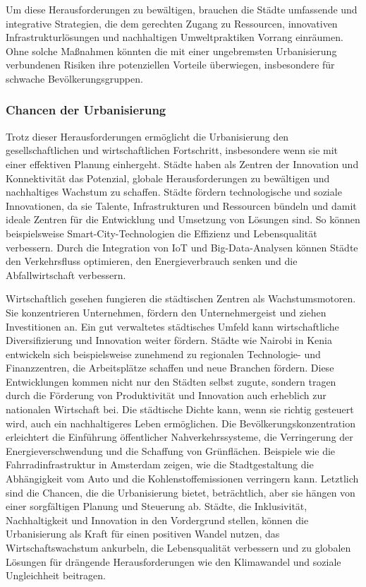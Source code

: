 \documentclass[conference,compsoc,final,a4paper, onecolumn, 11pt]{IEEEtran}
\begin{document}
Um diese Herausforderungen zu bewältigen, brauchen die Städte umfassende und integrative Strategien, die dem gerechten Zugang zu Ressourcen, innovativen Infrastrukturlösungen und nachhaltigen Umweltpraktiken Vorrang einräumen. 
Ohne solche Maßnahmen könnten die mit einer ungebremsten Urbanisierung verbundenen Risiken ihre potenziellen Vorteile überwiegen, insbesondere für schwache Bevölkerungsgruppen.


\subsubsection{Chancen der Urbanisierung}
Trotz dieser Herausforderungen ermöglicht die Urbanisierung den gesellschaftlichen und wirtschaftlichen Fortschritt, insbesondere wenn sie mit einer effektiven Planung einhergeht. 
Städte haben als Zentren der Innovation und Konnektivität das Potenzial, globale Herausforderungen zu bewältigen und nachhaltiges Wachstum zu schaffen. \autocite[S. 5ff]{Zhang2015-vv}
Städte fördern technologische und soziale Innovationen, da sie Talente, Infrastrukturen und Ressourcen bündeln und damit ideale Zentren für die Entwicklung und Umsetzung von Lösungen sind. \autocite[S. 5ff]{Zhang2015-vv}
So können beispielsweise Smart-City-Technologien die Effizienz und Lebensqualität verbessern. 
Durch die Integration von \ac{IoT} und Big-Data-Analysen können Städte den Verkehrsfluss optimieren, den Energieverbrauch senken und die Abfallwirtschaft verbessern. 

Wirtschaftlich gesehen fungieren die städtischen Zentren als Wachstumsmotoren. 
Sie konzentrieren Unternehmen, fördern den Unternehmergeist und ziehen Investitionen an. 
Ein gut verwaltetes städtisches Umfeld kann wirtschaftliche Diversifizierung und Innovation weiter fördern. \autocite[S. 5ff]{Zhang2015-vv}
Städte wie Nairobi in Kenia entwickeln sich beispielsweise zunehmend zu regionalen Technologie- und Finanzzentren, die Arbeitsplätze schaffen und neue Branchen fördern. 
Diese Entwicklungen kommen nicht nur den Städten selbst zugute, sondern tragen durch die Förderung von Produktivität und Innovation auch erheblich zur nationalen Wirtschaft bei. \autocite{gill_nairobis_2019}
Die städtische Dichte kann, wenn sie richtig gesteuert wird, auch ein nachhaltigeres Leben ermöglichen. 
Die Bevölkerungskonzentration erleichtert die Einführung öffentlicher Nahverkehrssysteme, die Verringerung der Energieverschwendung und die Schaffung von Grünflächen. 
Beispiele wie die Fahrradinfrastruktur in Amsterdam zeigen, wie die Stadtgestaltung die Abhängigkeit vom Auto und die Kohlenstoffemissionen verringern kann. \autocite{Buehler2010-pf}
Letztlich sind die Chancen, die die Urbanisierung bietet, beträchtlich, aber sie hängen von einer sorgfältigen Planung und Steuerung ab. 
Städte, die Inklusivität, Nachhaltigkeit und Innovation in den Vordergrund stellen, können die Urbanisierung als Kraft für einen positiven Wandel nutzen, das Wirtschaftswachstum ankurbeln, die Lebensqualität verbessern und zu globalen Lösungen für drängende Herausforderungen wie den Klimawandel und soziale Ungleichheit beitragen.
\end{document}
